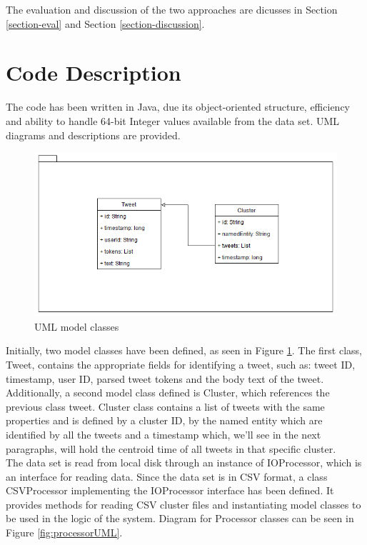 \documentclass[a4paper,portrait,12pt]{article}
\begin{document}
The evaluation and discussion of the two approaches are dicusses in Section \ref{section-eval} and Section \ref{section-discussion}.

\section{Code Description}
The code has been written in Java, due its object-oriented structure, efficiency and ability to handle 64-bit Integer values available from the data set.
UML diagrams and descriptions are provided.\\

\begin{figure}[h!]
	\centering
	\includegraphics[width=0.5\linewidth]{images/modelUML.png}
	\caption{UML model classes}
	\label{fig:modelUML}
\end{figure}

Initially, two model classes have been defined, as seen in Figure \ref{fig:modelUML}. The first class, Tweet, contains the appropriate fields for identifying a tweet, such as: tweet ID, timestamp, user ID, parsed tweet tokens and the body text of the tweet.
Additionally, a second model class defined is Cluster, which references the previous class tweet. Cluster class contains a list of tweets with the same properties and is defined by a cluster ID, by the named entity which are identified by all the tweets and a timestamp which, we'll see in the next paragraphs, will hold the centroid time of all tweets in that specific cluster.\\

The data set is read from local disk through an instance of IOProcessor, which is an interface for reading data.
Since the data set is in CSV format, a class CSVProcessor implementing the IOProcessor interface has been defined.
It provides methods for reading CSV cluster files and instantiating model classes to be used in the logic of the system.
Diagram for Processor classes can be seen in Figure \ref{fig:processorUML}. \\
\end{document}
